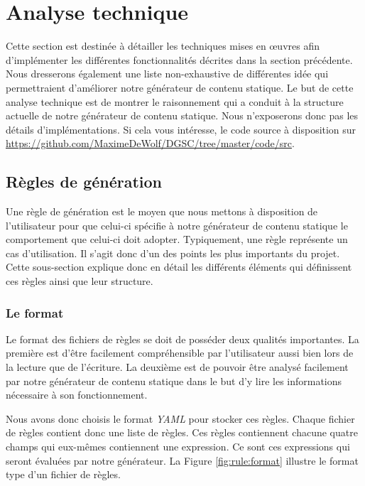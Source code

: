 \section{Analyse technique}
	Cette section est destinée à détailler les techniques mises en œuvres afin d'implémenter les différentes fonctionnalités décrites dans la section précédente. Nous dresserons également une liste non-exhaustive de différentes idée qui permettraient d'améliorer notre générateur de contenu statique. Le but de cette analyse technique est de montrer le raisonnement qui a conduit à la structure actuelle de notre générateur de contenu statique. Nous n'exposerons donc pas les détails d'implémentations. Si cela vous intéresse, le code source à disposition sur \url{https://github.com/MaximeDeWolf/DGSC/tree/master/code/src}.
	
	\subsection{Règles de génération}
	
	Une règle de génération est le moyen que nous mettons à disposition de l'utilisateur pour que celui-ci spécifie à notre générateur de contenu statique le comportement que celui-ci doit adopter.
	Typiquement, une règle représente un cas d'utilisation. Il s'agit donc d'un des points les plus importants du projet. Cette sous-section explique donc en détail les différents éléments qui définissent ces règles ainsi que leur structure.
	
	\subsubsection*{Le format}
	
		Le format des fichiers de règles se doit de posséder deux qualités importantes. La première est d'être facilement compréhensible par l'utilisateur aussi bien lors de la lecture que de l'écriture. La deuxième est de pouvoir être analysé facilement par notre générateur de contenu statique dans le but d'y lire les informations nécessaire à son fonctionnement.
		
		Nous avons donc choisis le format \textit{YAML} pour stocker ces règles. Chaque fichier de règles contient donc une liste de règles. Ces règles contiennent chacune quatre champs qui eux-mêmes contiennent une expression. Ce sont ces expressions qui seront évaluées par notre générateur. La Figure \ref{fig:rule:format} illustre le format type d'un fichier de règles.
		
